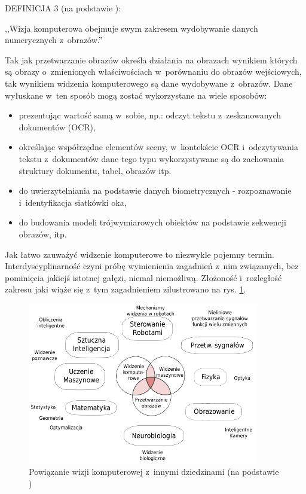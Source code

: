 DEFINICJA 3 (na podstawie \cite{morris2004computer}):

,,Wizja komputerowa obejmuje swym zakresem wydobywanie
danych numerycznych z~obrazów.''

Tak jak przetwarzanie obrazów określa działania na obrazach wynikiem
których są obrazy o~zmienionych właściwościach w~porównaniu do obrazów
wejściowych, tak wynikiem widzenia komputerowego są dane wydobywane
z~obrazów. Dane wyłuskane w~ten sposób mogą zostać wykorzystane
na wiele sposobów:
\begin{itemize}
    \item prezentując wartość samą w~sobie, np.: odczyt tekstu
        z~zeskanowanych dokumentów (OCR),
    \item określając współrzędne elementów sceny, w~kontekście OCR 
        i~odczytywania tekstu z~dokumentów dane tego typu
        wykorzystywane są do zachowania struktury dokumentu, tabel,
        obrazów itp.
    \item do uwierzytelniania na podstawie danych biometrycznych - 
        rozpoznawanie i~identyfikacja siatkówki oka,
    \item do budowania modeli trójwymiarowych obiektów na podstawie 
        sekwencji obrazów, itp.
\end{itemize}

Jak łatwo zauważyć widzenie komputerowe to niezwykle pojemny termin.
Interdyscyplinarność czyni próbę wymienienia zagadnień z~nim związanych,
bez pominięcia jakiejś istotnej gałęzi, niemal niemożliwą. 
Złożoność i~rozległość zakresu jaki wiąże się
z~tym zagadnieniem zilustrowano na rys. \ref{fig:int_cv_inter_discip}.

\begin{figure}[!h]
    \centering
    \includegraphics[width=0.9\textwidth]{img/int_cv_inter_discip}
    \caption{Powiązanie wizji komputerowej z~innymi dziedzinami 
        (na podstawie \cite{wiki:computervision})}
    \label{fig:int_cv_inter_discip}
\end{figure}

